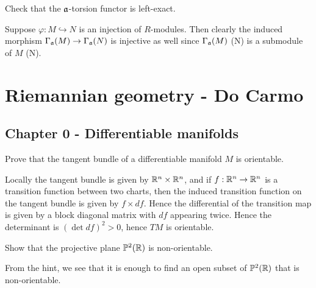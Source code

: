 \documentclass[11pt, english]{article}
\begin{document}
\begin{exc}[Exercise 7.2]
Check that the $\mathfrak{a}$-torsion functor is left-exact.
\end{exc}
\begin{sol}
Suppose $\varphi:M \hookrightarrow N$ is an injection of $R$-modules. Then clearly the induced morphism $\Gamma_{\mathfrak{a}}(M) \to \Gamma_{\mathfrak{a}}(N)$ is injective as well since $\Gamma_{\mathfrak{a}}(M)$ (N) is a submodule of $M$ (N). 
\end{sol} 




\section{Riemannian geometry - Do Carmo}

\subsection{Chapter 0 - Differentiable manifolds}

\begin{exc}[Excercise 2]
 Prove that the tangent bundle of a differentiable manifold $M$ is orientable.
\end{exc}
\begin{sol}
Locally the tangent bundle is given by $\mathbb{R}^n \times \mathbb{R}^n$, and if $f:\mathbb{R}^n \to \mathbb{R}^n$ is a transition function between two charts, then the induced transition function on the tangent bundle is given by $f \times df$. Hence the differential of the transition map is given by a block diagonal matrix with $df$ appearing twice. Hence the determinant is $(\det df)^2 > 0$, hence $TM$ is orientable.
\end{sol}

\begin{exc}[Exercise 4]
  Show that the projective plane $\mathbb{P}^2(\mathbb{R})$ is non-orientable.
\end{exc}
\begin{sol}
  From the hint, we see that it is enough to find an open subset of $\mathbb{P}^2(\mathbb{R})$ that is non-orientable. 
\end{sol}
\end{document}

